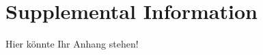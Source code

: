 \documentclass[
	12pt,
    a4paper,
    egregdoesnotlikesansseriftitles, %
    toc=chapterentrywithdots,
    oneside, openany,
    titlepage,
    parskip=half,
    headings=normal,  %
    listof=totoc,
    bibliography=totocnumbered,
    index=totoc,
    captions=tableheading,  %
    listof=flat,
    numbers=noenddot, %
    final]
    {scrbook}
\begin{document}
\backmatter

\printnoidxglossaries

%
%
%
\printbibliography

\clearpage %


\appendix
\chapter{Supplemental Information}\label{app:supplemental-information}
Hier könnte Ihr Anhang stehen!


\end{document}
